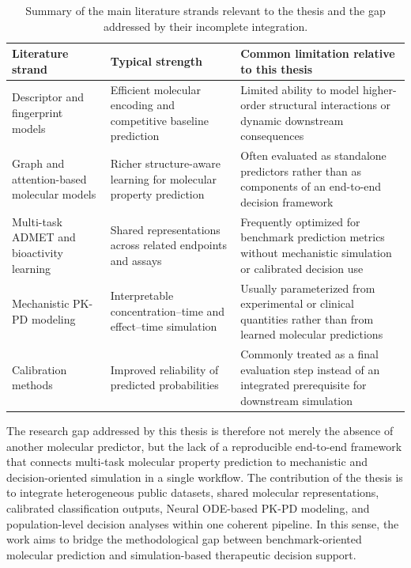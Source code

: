 \documentclass[a4paper,11pt,twoside]{report}
\begin{document}
\begin{table}[htbp]
\centering
\small
\caption{Summary of the main literature strands relevant to the thesis and the gap addressed by their incomplete integration.}
\label{tab:related_work_gap}
\begin{tabular}{|p{3.4cm}|p{4.3cm}|p{4.3cm}|}
\hline
\textbf{Literature strand} & \textbf{Typical strength} & \textbf{Common limitation relative to this thesis} \\
\hline
Descriptor and fingerprint models & Efficient molecular encoding and competitive baseline prediction & Limited ability to model higher-order structural interactions or dynamic downstream consequences \\
\hline
Graph and attention-based molecular models & Richer structure-aware learning for molecular property prediction & Often evaluated as standalone predictors rather than as components of an end-to-end decision framework \\
\hline
Multi-task ADMET and bioactivity learning & Shared representations across related endpoints and assays & Frequently optimized for benchmark prediction metrics without mechanistic simulation or calibrated decision use \\
\hline
Mechanistic PK-PD modeling & Interpretable concentration--time and effect--time simulation & Usually parameterized from experimental or clinical quantities rather than from learned molecular predictions \\
\hline
Calibration methods & Improved reliability of predicted probabilities & Commonly treated as a final evaluation step instead of an integrated prerequisite for downstream simulation \\
\hline
\end{tabular}
\end{table}

The research gap addressed by this thesis is therefore not merely the absence of another molecular predictor, but the lack of a reproducible end-to-end framework that connects multi-task molecular property prediction to mechanistic and decision-oriented simulation in a single workflow. The contribution of the thesis is to integrate heterogeneous public datasets, shared molecular representations, calibrated classification outputs, Neural ODE-based PK-PD modeling, and population-level decision analyses within one coherent pipeline. In this sense, the work aims to bridge the methodological gap between benchmark-oriented molecular prediction and simulation-based therapeutic decision support.
\end{document}

